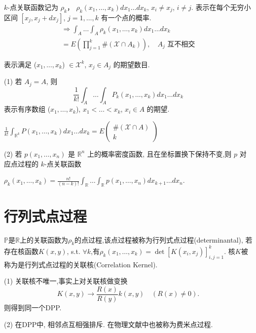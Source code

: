 $k$-点关联函数记为 $\rho_k$，
$\rho_k(x_1, \ldots, x_k) dx_1 \ldots dx_k$, \quad$x_i \ne x_j$, $i \ne j$.
表示在每个无穷小区间 $[x_j, x_j+dx_j]$, $j=1,\ldots,k$ 有一个点的概率.
\begin{equation*}
    \begin{aligned}
        \Rightarrow \int_A \ldots \int_A \rho_k(x_1, \ldots, x_k) dx_1 \ldots dx_k\\
        = E(\prod_{j=1}^k\#(\mathcal{X} \cap A_k)), \quad A_j \text{ 互不相交}
    \end{aligned}
\end{equation*}

表示满足 ($x_1, \ldots, x_k$) $\in \mathcal{X}^k$, $x_j \in A_j$ 的期望数目.

\begin{remark}
    (1) 若 $A_j=A$, 则
    \[\frac{1}{k!} \int_A \ldots \int_A P_k(x_1, \ldots, x_k) dx_1 \ldots dx_k\]
    表示有序数组 ($x_1, \ldots, x_k$), $x_1 < \ldots < x_k$, $x_i \in A$ 的期望.

$\frac{1}{k!} \int_{\mathbb{R}^k} P(x_1, \ldots, x_k) dx_1 \ldots dx_k = E\begin{pmatrix}
    \#(\mathcal{X} \cap A)\\
    k
\end{pmatrix}$

(2) 若 $p(x_1, \ldots, x_n)$ 是 $\mathbb{R}^n$ 上的概率密度函数,
且在坐标置换下保持不变,则 $p$ 对应点过程的
$k$-点关联函数
\end{remark}

$\rho_k(x_1, \ldots, x_k) = \frac{n!}{(n-k)!} \int_{\mathbb{R}} \ldots \int_{\mathbb{R}}p(x_1, \ldots, x_n) dx_{k+1} \ldots dx_n$.

\section{行列式点过程}
\begin{definition}
    $\mathbb{P}$是$\mathbb{R}$上的关联函数为$\rho_k$的点过程,该点过程被称为行列式点过程(determinantal),
    若存在核函数$K(x,y)$, s.t. $\forall k$,有$\rho_k(x_1, \ldots, x_k) = \det[K(x_i, x_j)]_{i,j=1}^k$.
    核$K$被称为是行列式点过程的关联核(Correlation Kernel).
\end{definition}

\begin{remark}
    (1) 关联核不唯一,事实上对关联核做变换
\[ K(x,y)\rightarrow\frac{R(x)}{R(y)} k(x,y) \quad (R(x) \neq 0). \]
则得到同一个DPP.

(2) 在DPP中, 相邻点互相强排斥. 在物理文献中也被称为费米点过程.
\end{remark}
 
